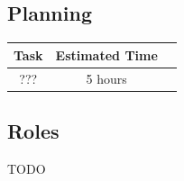 \documentclass[12pt]{article}
\begin{document}
        {\color{color_subsection}\subsection{Planning}}
           
	\begin{center}
	\begin{tabular}{ |c|c|c| } 
 	\hline
	 Task & Estimated Time \\ 
	\hline
 	??? & 5 hours \\ 
	 \hline
	\end{tabular}
	\end{center}
	



        {\color{color_subsection}\subsection{Roles}}
            TODO
\end{document}
